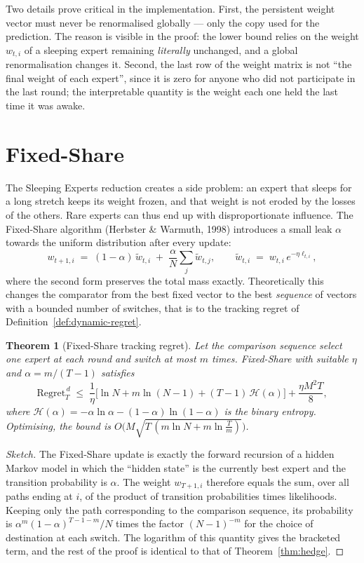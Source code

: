\documentclass[12pt,a4paper,oneside]{report}
\renewcommand{\_}{\oldunderscore\allowbreak}
\theoremstyle{definition}
\theoremstyle{plain}
\newtheorem{theorem}{Theorem}[chapter]
\theoremstyle{remark}
\begin{document}
Two details prove critical in the implementation. First, the persistent weight vector must never
be renormalised globally --- only the copy used for the prediction. The reason is visible in the
proof: the lower bound relies on the weight $w_{t,i}$ of a sleeping expert remaining
\emph{literally} unchanged, and a global renormalisation changes it. Second, the last row of the
weight matrix is not ``the final weight of each expert'', since it is zero for anyone who did
not participate in the last round; the interpretable quantity is the weight each one held the
last time it was awake.

\section{Fixed-Share}
\label{sec:fixed-share}

The Sleeping Experts reduction creates a side problem: an expert that sleeps for a long stretch
keeps its weight frozen, and that weight is not eroded by the losses of the others. Rare experts
can thus end up with disproportionate influence. The Fixed-Share algorithm (Herbster \& Warmuth,
1998) introduces a small leak $\alpha$ towards the uniform distribution after every update:
\[
w_{t+1,i} \;=\; (1-\alpha)\,\tilde{w}_{t,i} \;+\; \frac{\alpha}{N}\sum_{j} \tilde{w}_{t,j},
\qquad \tilde{w}_{t,i} \;=\; w_{t,i}\,e^{-\eta \ell_{t,i}},
\]
where the second form preserves the total mass exactly. Theoretically this changes the
comparator from the best fixed vector to the best \emph{sequence} of vectors with a bounded
number of switches, that is to the tracking regret of
Definition~\ref{def:dynamic-regret}.

\begin{theorem}[Fixed-Share tracking regret]
\label{thm:fixed-share}
Let the comparison sequence select one expert at each round and switch at most $m$ times.
Fixed-Share with suitable $\eta$ and $\alpha = m/(T-1)$ satisfies
\[
\mathrm{Regret}_T^{\,d} \;\leq\; \frac{1}{\eta}\Big[ \ln N + m \ln(N-1)
+ (T-1)\,\mathcal{H}(\alpha) \Big] + \frac{\eta M^2 T}{8},
\]
where $\mathcal{H}(\alpha) = -\alpha\ln\alpha - (1-\alpha)\ln(1-\alpha)$ is the binary entropy.
Optimising, the bound is $O\big(M\sqrt{T\,(m\ln N + m\ln\frac{T}{m})}\big)$.
\end{theorem}

\begin{proof}[Sketch]
The Fixed-Share update is exactly the forward recursion of a hidden Markov model in which the
``hidden state'' is the currently best expert and the transition probability is $\alpha$. The
weight $w_{T+1,i}$ therefore equals the sum, over all paths ending at $i$, of the product of
transition probabilities times likelihoods. Keeping only the path corresponding to the
comparison sequence, its probability is $\alpha^{m}(1-\alpha)^{T-1-m}/N$ times the factor
$(N-1)^{-m}$ for the choice of destination at each switch. The logarithm of this quantity gives
the bracketed term, and the rest of the proof is identical to that of
Theorem~\ref{thm:hedge}.
\end{proof}
\end{document}
